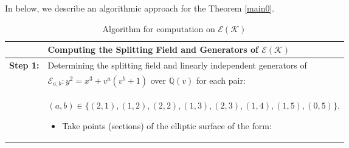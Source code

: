 \documentclass[11pt]{amsart}
\begin{document}
	
In below,   we describe an algorithmic approach for the   Theorem \ref{main0}.  


\begin{table}[htbp]
	\centering
	\caption{Algorithm for computation on $\mathcal{E}(\mathcal{K})$} 
	\label{tab:algorithm}
	\begin{tabularx}{\textwidth}{@{} l X @{}} 
		\toprule
		& \textbf{Computing the Splitting Field and Generators of $\mathcal{E}(\mathcal{K})$} \\ 
		\midrule
		\textbf{Step 1:} & Determining the splitting field and linearly independent generators of\\
		& $\mathcal{E}_{a,b}: y^2=x^3+ v^a (v^b+1)$ over $\mathbb{Q}(v)$ for each pair: \\
	& 	$(a,b) \in \{ (2, 1), (1,2), (2, 2), (1, 3), (2, 3) , (1, 4) , (1, 5), (0, 5) \}$.
		
		\begin{itemize}[leftmargin=*, nosep, topsep=2pt]
			\item Take points (sections) of the elliptic surface of the form:
			

\end{itemize}
\end{tabularx}
\end{table}
\end{document}
